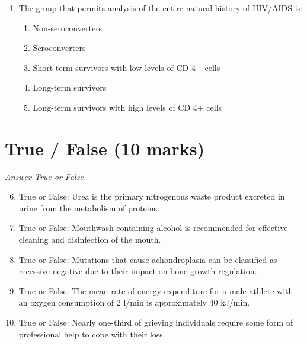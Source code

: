 \documentclass[12pt]{article}
\begin{document}
\begin{enumerate}[label=\arabic*.]
\begin{enumerate}[label=(\alph*)]
    \item Possesses only RNA
    \item A stable and unchanging genome
    \item Possesses only DNA
    \item Has a single, unsegmented genome
    \item Possesses RNA and DNA
\end{enumerate}
\item The group that permits analysis of the entire natural history of HIV/AIDS is:
\begin{enumerate}[label=(\alph*)]
    \item Non-seroconverters
    \item Seroconverters
    \item Short-term survivors with low levels of CD 4+ cells
    \item Long-term survivors
    \item Long-term survivors with high levels of CD 4+ cells
\end{enumerate}
\end{enumerate}

\section*{True / False (10 marks)}
\textit{Answer True or False}
\begin{enumerate}[label=\arabic*.]
\setcounter{enumi}{5}
\item True or False: Urea is the primary nitrogenous waste product excreted in urine from the metabolism of proteins.
\item True or False: Mouthwash containing alcohol is recommended for effective cleaning and disinfection of the mouth.
\item True or False: Mutations that cause achondroplasia can be classified as recessive negative due to their impact on bone growth regulation.
\item True or False: The mean rate of energy expenditure for a male athlete with an oxygen consumption of 2 l/min is approximately 40 kJ/min.
\item True or False: Nearly one-third of grieving individuals require some form of professional help to cope with their loss.
\end{enumerate}
\end{document}
